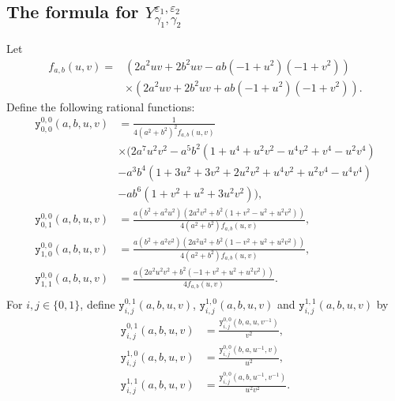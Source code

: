\documentclass[11pt,twoside]{amsart}
\theoremstyle{plain}
\numberwithin{quest}{section}
\theoremstyle{remark}
\numberwithin{rem}{section}
\theoremstyle{definition}
\begin{document}
\begin{appendix}
		\section{The formula for $Y_{\gamma_1,\gamma_2}^{\varepsilon_1,\varepsilon_2}$ }\label{sec:appendix:Y}
		Let
		\begin{equation*}
			\begin{split}
				f_{a,b}(u,v)=&
				\left(2 a^2 u v+2 b^2 u v-a b \left(-1+u^2\right) \left(-1+v^2\right)\right)\\&\times \left(2 a^2 u v+2 b^2 u v+a b \left(-1+u^2\right) \left(-1+v^2\right)\right).
			\end{split}
		\end{equation*}
		Define the following rational functions:
        \begin{align*}
            \mathtt{y}_{0,0}^{0,0}(a,b,u,v) &=  \frac{1}{4 \left(a^2+b^2\right)^2f_{a,b}(u,v)}\\
            &\times \Big(
				2 a^7 u^2 v^2-a^5 b^2 \left(1+u^4+u^2 v^2-u^4 v^2+v^4-u^2 v^4\right) \\
				&-a^3 b^4 \left(1+3 u^2+3 v^2+2 u^2 v^2+u^4 v^2+u^2 v^4-u^4 v^4\right) \\
                &-a b^6 \left(1+v^2+u^2 +3u^2 v^2\right)
				\Big),\\
                \mathtt{y}_{0,1}^{0,0}(a,b,u,v)&= \frac{a \left(b^2+a^2 u^2\right) \left(2 a^2 v^2+b^2 \left(1+v^2-u^2+u^2 v^2\right)\right)}{4 \left(a^2+b^2\right)f_{a,b}(u,v)}, \\
                \mathtt{y}_{1,0}^{0,0}(a,b,u,v)&= \frac{a \left(b^2+a^2 v^2\right) \left(2 a^2 u^2+b^2 \left(1-v^2+u^2+u^2 v^2\right)\right)}{4 \left(a^2+b^2\right)f_{a,b}(u,v)}, \\
                \mathtt{y}_{1,1}^{0,0}(a,b,u,v)&= \frac{ a \left(2 a^2 u^2 v^2+b^2 \left(-1+v^2+u^2+u^2 v^2\right)\right) }{4 f_{a,b}(u,v)}.\\
        \end{align*}
		For $i,j \in \{0,1\}$,  define $\mathtt{y}^{0,1}_{i,j}(a,b,u,v)$, $\mathtt{y}^{1,0}_{i,j}(a,b,u,v)$ and $\mathtt{y}^{1,1}_{i,j}(a,b,u,v)$ by
		\begin{equation*}
        \begin{split}
			\mathtt{y}^{0,1}_{i,j}(a,b,u,v)&=\frac{\mathtt{y}^{0,0}_{i,j}(b,a,u,v^{-1})}{v^2}, \\
			\mathtt{y}^{1,0}_{i,j}(a,b,u,v)&=\frac{\mathtt{y}^{0,0}_{i,j}(b,a,u^{-1},v)}{u^2}, \\
			\mathtt{y}^{1,1}_{i,j}(a,b,u,v)&=\frac{\mathtt{y}^{0,0}_{i,j}(a,b,u^{-1},v^{-1})}{u^2v^2}.

\end{split}
\end{equation*}
\end{appendix}
\end{document}
